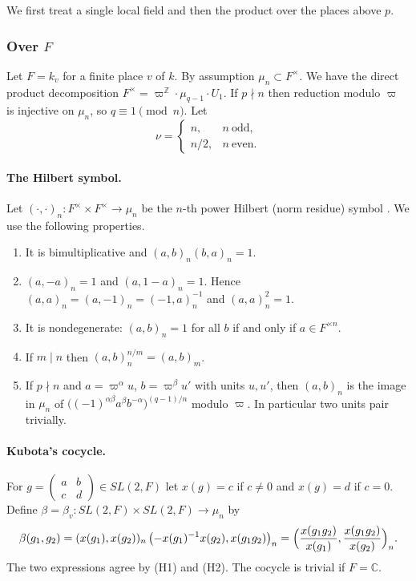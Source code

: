 \documentclass[12pt,letterpaper]{article}
\numberwithin{equation}{section}
\theoremstyle{definition}
\newcommand{\C}{\mathbb C}
\newcommand{\Z}{\mathbb Z}
\newcommand{\vp}{\varpi}
\begin{document}
We first treat a single local field and then the product over the places above $p$.

\subsubsection{\texorpdfstring{Over $F$}{Over F}}\label{subsubsec:overF}

Let $F=k_v$ for a finite place $v$ of $k$.  By assumption $\mu_n\subset F^\times$.  We have
the direct product decomposition $F^\times=\vp^{\Z}\cdot\mu_{q-1}\cdot U_1$.  If $p\nmid n$
then reduction modulo $\vp$ is injective on $\mu_n$, so $q\equiv1\pmod n$.  Let
\begin{equation}\label{eq:nu}
\nu=\begin{cases} n,& n\ \text{odd},\\ n/2,& n\ \text{even}.\end{cases}
\end{equation}

\paragraph{The Hilbert symbol.}  Let $(\cdot,\cdot)_n:F^\times\times F^\times\to\mu_n$ be
the $n$-th power Hilbert (norm residue) symbol \cite[Ch.~XIII, \S5]{We75}.  We use the
following properties.
\begin{enumerate}[label=(H\arabic*),leftmargin=*,itemsep=1pt]
\item It is bimultiplicative and $(a,b)_n(b,a)_n=1$.
\item $(a,-a)_n=1$ and $(a,1-a)_n=1$.  Hence $(a,a)_n=(a,-1)_n=(-1,a)_n^{-1}$ and $(a,a)_n^2=1$.
\item It is nondegenerate: $(a,b)_n=1$ for all $b$ if and only if $a\in F^{\times n}$.
\item If $m\mid n$ then $(a,b)_n^{n/m}=(a,b)_m$.
\item If $p\nmid n$ and $a=\vp^{\alpha}u$, $b=\vp^{\beta}u'$ with units $u,u'$, then
$(a,b)_n$ is the image in $\mu_n$ of $\bigl((-1)^{\alpha\beta}a^{\beta}b^{-\alpha}\bigr)^{(q-1)/n}$
modulo $\vp$.  In particular two units pair trivially.
\end{enumerate}

\paragraph{Kubota's cocycle.}  For $g=\begin{pmatrix}a&b\\c&d\end{pmatrix}\in SL(2,F)$ let
$x(g)=c$ if $c\ne0$ and $x(g)=d$ if $c=0$.  Define
$\beta=\beta_v:SL(2,F)\times SL(2,F)\to\mu_n$ by
\begin{equation}\label{eq:beta}
\beta(g_1,g_2)=(x(g_1),x(g_2))_n\,\bigl(-x(g_1)^{-1}x(g_2),x(g_1g_2)\bigr)_n
=\Bigl(\frac{x(g_1g_2)}{x(g_1)},\frac{x(g_1g_2)}{x(g_2)}\Bigr)_n .
\end{equation}
The two expressions agree by (H1) and (H2).  The cocycle is trivial if $F=\C$.
\end{document}

